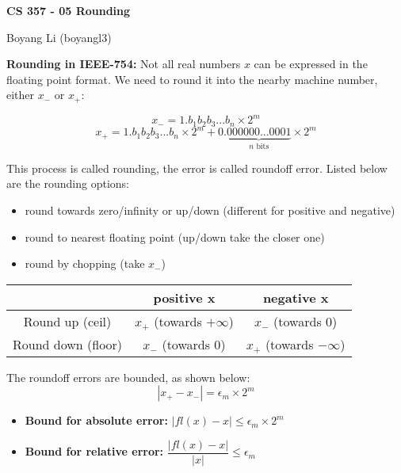 \documentclass[12pt]{article}
\begin{document}
\begin{center}\Large\bf 
CS 357 - 05 Rounding\\
\end{center}
\begin{center}
Boyang Li (boyangl3)
\end{center}

\medskip
\noindent \textbf{Rounding in IEEE-754:} Not all real numbers $x$ can be expressed in the floating point format. We need to round it into the nearby machine number, either $x_-$ or $x_+$:

    $$ x_{-} = 1.b_1 b_2 b_3 ... b_n \times 2^m $$
    $$ x_{+} = 1.b_1 b_2 b_3 ... b_n \times 2^m + 0.\underbrace{000000...0001}_{n\text{ bits}} \times 2^m $$

    This process is called rounding, the error is called roundoff error. Listed below are the rounding options: 
        \begin{itemize}
            \item round towards zero/infinity or up/down (different for positive and negative)
            \item round to nearest floating point (up/down take the closer one)
            \item round by chopping (take $x_-$)
        \end{itemize}

    \begin{center} \renewcommand\arraystretch{2}
        \begin{tabular}{|c|c|c|}
             \hline & \textbf{positive $\boldsymbol{x}$} & \textbf{negative $\boldsymbol{x}$} \\
             \hline Round up (ceil) & $x_+$ (towards $+\infty$) & $x_-$ (towards 0) \\
             \hline Round down (floor) & $x_-$ (towards 0) & $x_+$ (towards $-\infty$) \\
             \hline
        \end{tabular}
    \end{center}

    The roundoff errors are bounded, as shown below:
    $$ |x_+ - x_-| = \epsilon_m \times 2^m$$

    \begin{itemize}
        \item \textbf{Bound for absolute error:} $|fl(x) - x| \leq \epsilon_m \times 2^m$
        \item \textbf{Bound for relative error:} $\dfrac{|fl(x) - x|}{|x|}  \leq \epsilon_m$
    \end{itemize}
\end{document}
